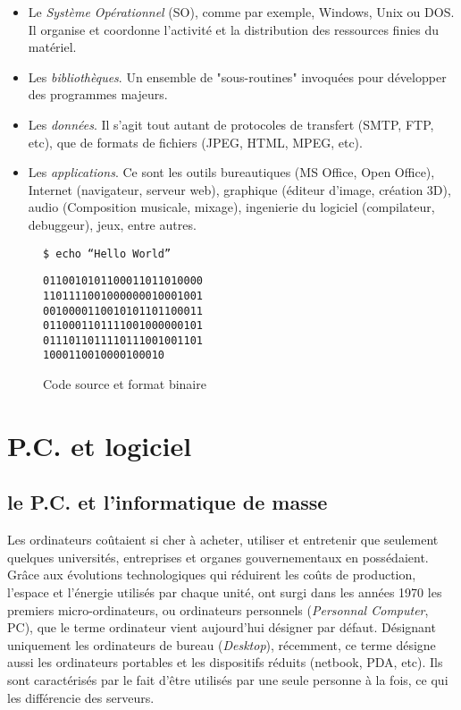 \begin{itemize}
\item Le \emph{Système Opérationnel} (SO), comme par exemple, Windows, Unix ou DOS. Il organise et coordonne l'activité et la distribution des ressources finies du matériel.
\item Les \emph{bibliothèques}. Un ensemble de "sous-routines" invoquées pour développer des programmes majeurs.
\item Les \emph{données}. Il s'agit tout autant de protocoles de transfert (SMTP, FTP, etc), que de formats de fichiers (JPEG, HTML, MPEG, etc).
\item Les \emph{applications}. Ce sont les outils bureautiques (MS Office, Open Office), Internet (navigateur, serveur web), graphique (éditeur d'image, création 3D), audio (Composition musicale, mixage), ingenierie du logiciel (compilateur, debuggeur), jeux, entre autres.
\end{itemize}

\begin{figure}[htb]
\caption{Code source et format binaire}
\label{fig1.1}
\begin{multicols}{2}
\begin{verbatim}
$ echo “Hello World”
\end{verbatim}
\columnbreak
\begin{verbatim}
0110010101100011011010000
1101111001000000010001001
0010000110010101101100011
0110001101111001000000101
0111011011110111001001101
1000110010000100010
\end{verbatim}
\end{multicols}
\end{figure}

\section{P.C. et logiciel} \label{1.2}

\subsection{le P.C. et l'informatique de masse} \label{1.2.1}

Les ordinateurs coûtaient si cher à acheter, utiliser et entretenir que seulement quelques universités, entreprises et organes gouvernementaux en possédaient. Grâce aux évolutions technologiques qui réduirent les coûts de production, l'espace et l'énergie utilisés par chaque unité, ont surgi dans les années 1970 les premiers micro-ordinateurs, ou ordinateurs personnels (\emph{Personnal Computer}, PC), que le terme ordinateur vient aujourd'hui désigner par défaut. Désignant uniquement les ordinateurs de bureau (\emph{Desktop}), récemment, ce terme désigne aussi les ordinateurs portables et les dispositifs réduits (netbook, PDA, etc). Ils sont caractérisés par le fait d'être utilisés par une seule personne à la fois, ce qui les différencie des serveurs.

